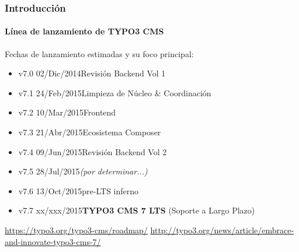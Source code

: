 
\begin{frame}[fragile]
	\frametitle{Introducción}
	\framesubtitle{Línea de lanzamiento de TYPO3 CMS}

	Fechas de lanzamiento estimadas y su foco principal:

	\begin{itemize}
		\item v7.0 \textrightarrow\tabto{1.3cm}02/Dic/2014\tabto{3.4cm}Revisión Backend Vol 1

		\item
			\begingroup
				\color{typo3orange}
					v7.1 \textrightarrow\tabto{1.3cm}24/Feb/2015\tabto{3.4cm}Limpieza de Núcleo \& Coordinación
			\endgroup

		\item v7.2 \textrightarrow\tabto{1.3cm}10/Mar/2015\tabto{3.4cm}Frontend
		\item v7.3 \textrightarrow\tabto{1.3cm}21/Abr/2015\tabto{3.4cm}Ecosistema Composer
		\item v7.4 \textrightarrow\tabto{1.3cm}09/Jun/2015\tabto{3.4cm}Revisión Backend Vol 2
		\item v7.5 \textrightarrow\tabto{1.3cm}28/Jul/2015\tabto{3.4cm}\textit{(por determinar...)}
		\item v7.6 \textrightarrow\tabto{1.3cm}13/Oct/2015\tabto{3.4cm}pre-LTS inferno
		\item v7.7 \textrightarrow\tabto{1.3cm}xx/xxx/2015\tabto{3.4cm}\textbf{TYPO3 CMS 7 LTS} (Soporte a Largo Plazo)
	\end{itemize}

	\smaller
		\url{https://typo3.org/typo3-cms/roadmap/}\newline
		\url{http://typo3.org/news/article/embrace-and-innovate-typo3-cms-7/}
	\normalsize

\end{frame}


